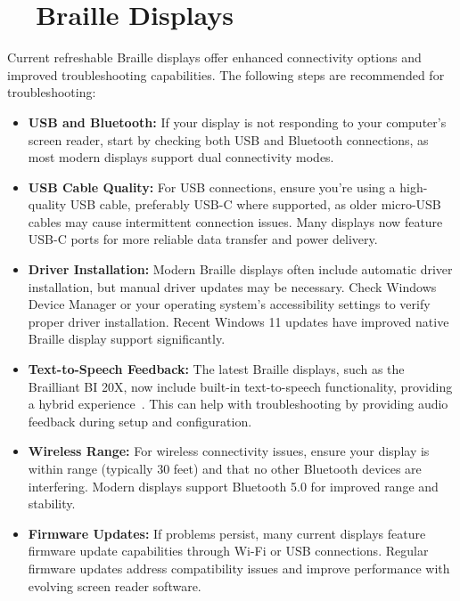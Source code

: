 \section{~~Braille Displays}
\label{app2:display2}
Current refreshable Braille displays offer enhanced connectivity options and improved troubleshooting capabilities. The following steps are recommended for troubleshooting:

\begin{itemize}
	\item \textbf{USB and Bluetooth:} If your display is not responding to your computer's screen reader, start by checking both USB and Bluetooth connections, as most modern displays support dual connectivity modes.
	\item \textbf{USB Cable Quality:} For USB connections, ensure you're using a high-quality USB cable, preferably USB-C where supported, as older micro-USB cables may cause intermittent connection issues. Many displays now feature USB-C ports for more reliable data transfer and power delivery.
	\item \textbf{Driver Installation:} Modern Braille displays often include automatic driver installation, but manual driver updates may be necessary. Check Windows Device Manager or your operating system's accessibility settings to verify proper driver installation. Recent Windows 11 updates have improved native Braille display support significantly.
	\item \textbf{Text-to-Speech Feedback:} The latest Braille displays, such as the Brailliant BI 20X, now include built-in text-to-speech functionality, providing a hybrid experience~\supercite{BrailliantBI20X}. This can help with troubleshooting by providing audio feedback during setup and configuration.
	\item \textbf{Wireless Range:} For wireless connectivity issues, ensure your display is within range (typically 30 feet) and that no other Bluetooth devices are interfering. Modern displays support Bluetooth 5.0 for improved range and stability.
	\item \textbf{Firmware Updates:} If problems persist, many current displays feature firmware update capabilities through Wi-Fi or USB connections. Regular firmware updates address compatibility issues and improve performance with evolving screen reader software.
\end{itemize}

